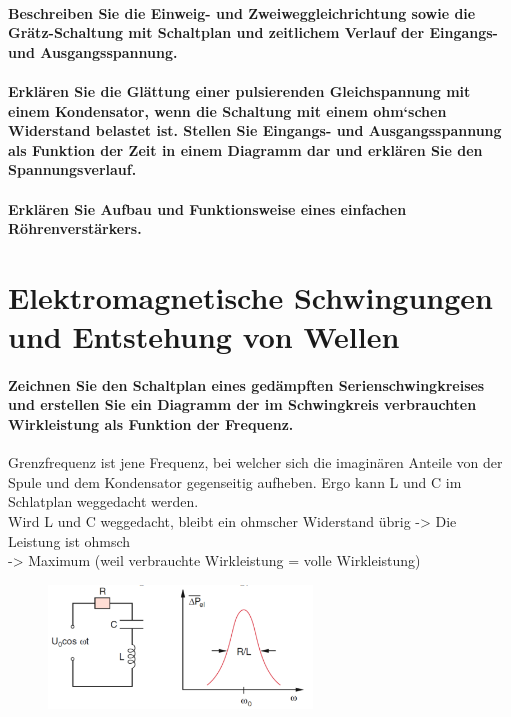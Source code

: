 \documentclass[a4paper, 11pt, parskip=half]{scrartcl}
\begin{document}
\paragraph{Beschreiben Sie die Einweig- und Zweiweggleichrichtung sowie die Grätz-Schaltung mit
Schaltplan und zeitlichem Verlauf der Eingangs- und Ausgangsspannung.}

\paragraph{Erklären Sie die Glättung einer pulsierenden Gleichspannung mit einem Kondensator, wenn
die Schaltung mit einem ohm‘schen Widerstand belastet ist. Stellen Sie Eingangs- und
Ausgangsspannung als Funktion der Zeit in einem Diagramm dar und erklären Sie den Spannungsverlauf.}

\paragraph{Erklären Sie Aufbau und Funktionsweise eines einfachen Röhrenverstärkers.}

\newpage

\section{Elektromagnetische Schwingungen und Entstehung von Wellen}

\paragraph{Zeichnen Sie den Schaltplan eines gedämpften Serienschwingkreises und erstellen Sie ein
Diagramm der im Schwingkreis verbrauchten Wirkleistung als Funktion der Frequenz.} 
Grenzfrequenz ist jene Frequenz, bei welcher sich die imaginären Anteile von der Spule und dem Kondensator gegenseitig aufheben. Ergo kann L und C im Schlatplan weggedacht werden.
\\
Wird L und C weggedacht, bleibt ein ohmscher Widerstand übrig -> Die Leistung ist ohmsch \\
-> Maximum (weil verbrauchte Wirkleistung = volle Wirkleistung)
\begin{figure}[H]
    \centering
    \includegraphics[width=7cm]{image/12/1.png}
\end{figure}
\end{document}
